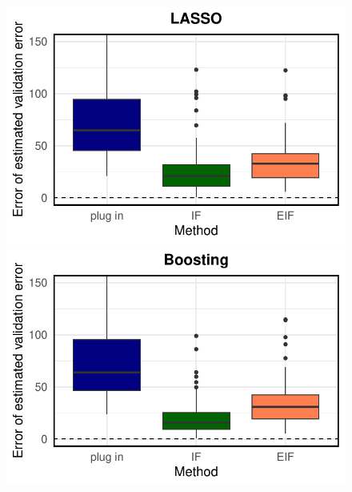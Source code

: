 \begin{figure}[ht]
\begin{minipage}{0.3\textwidth}
                \includegraphics[clip, trim = 0cm 0cm 0cm 0cm, width = \textwidth]{plot/ACIC_nonlinear_propensity_linear_HTE_estimator_error_LASSO.pdf}
        \end{minipage}        
        \begin{minipage}{0.3\textwidth}
                \centering
                \includegraphics[clip, trim = 0cm 0cm 0cm 0cm, width = \textwidth]{plot/ACIC_nonlinear_propensity_linear_HTE_estimator_error_Boosting.pdf}
        \end{minipage}
        \begin{minipage}{0.3\textwidth}
                \centering

\end{minipage}
\end{figure}
